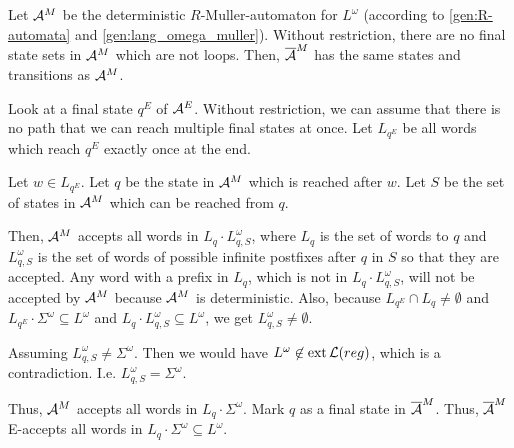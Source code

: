 Let $\mathcal{A}^M$ be the deterministic $R$-Muller-automaton for $L^\omega$ (according to \ref{gen:R-automata} and \ref{gen:lang_omega_muller}). Without restriction, there are no final state sets in $\mathcal{A}^M$ which are not loops. Then, $\overline{\mathcal{A}}^M$ has the same states and transitions as $\mathcal{A}^M$.

Look at a final state $q^E$ of $\mathcal{A}^E$. Without restriction, we can assume that there is no path that we can reach multiple final states at once. Let $L_{q^E}$ be all words which reach $q^E$ exactly once at the end.

Let $w \in L_{q^E}$.
Let $q$ be the state in $\mathcal{A}^M$ which is reached after $w$. Let $S$ be the set of states in $\mathcal{A}^M$ which can be reached from $q$.

Then, $\mathcal{A}^M$ accepts all words in $L_q \cdot L_{q,S}^\omega$, where $L_q$ is the set of words to $q$ and $L^\omega_{q,S}$ is the set of words of possible infinite postfixes after $q$ in $S$ so that they are accepted.
Any word with a prefix in $L_q$, which is not in $L_q \cdot L^\omega_{q,S}$, will not be accepted by $\mathcal{A}^M$ because $\mathcal{A}^M$ is deterministic. Also, because $L_{q^E} \cap L_q \neq \emptyset$ and $L_{q^E} \cdot \Sigma^\omega \subseteq L^\omega$ and $L_q \cdot L^\omega_{q,S} \subseteq L^\omega$, we get $L^\omega_{q,S} \neq \emptyset$.

Assuming $L^\omega_{q,S} \neq \Sigma^\omega$. Then we would have $L^\omega \not\in \operatorname{ext} \mathcal{L}(reg)$, which is a contradiction. I.e. $L^\omega_{q,S} = \Sigma^\omega$.

Thus, $\mathcal{A}^M$ accepts all words in $L_q \cdot \Sigma^\omega$. Mark $q$ as a final state in $\overline{\mathcal{A}}^M$. Thus, $\overline{\mathcal{A}}^M$ E-accepts all words in $L_q \cdot \Sigma^\omega \subseteq L^\omega$.


